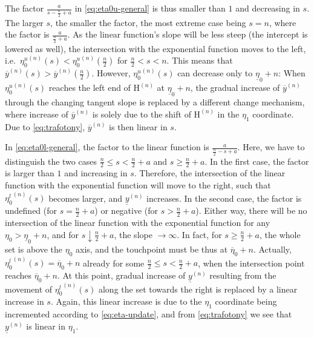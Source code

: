 \documentclass[runningheads,a4paper]{llncs}
\newcommand{\un}{^{(n)}} %
\newcommand{\ul}[1]{\underline{#1}}
\newcommand{\ol}[1]{\overline{#1}}
\def\ynl{\ul{y}\un}
\def\ynu{\ol{y}\un}
\def\EN{\mathrm{H}\un}
\def\ezl{\ul{\eta}_0}
\def\ezu{\ol{\eta}_0}
\begin{document}
The factor $\frac{a}{s - \frac{n}{2} + a}$
in \eqref{eq:eta0u-general} is thus smaller than $1$ and decreasing in $s$.
The larger $s$, the smaller the factor, the most extreme case being $s=n$,
where the factor is $\frac{a}{\frac{n}{2} + a}$.
As the linear function's slope will be less steep (the intercept is lowered as well),
the intersection with the exponential function moves to the left,
i.e.\ ${\eta_0^u}\un(s) < {\eta_0^u}\un(\frac{n}{2})$ for $\frac{n}{2} < s < n$.
This means that $\ynu(s) > \ynu(\frac{n}{2})$.
However, ${\eta_0^u}\un(s)$ can decrease only to $\ezl+n$:
When ${\eta_0^u}\un(s)$ reaches the left end of $\EN$ at $\ezl+n$,
the gradual increase of $\ynu$ through the changing tangent slope 
is replaced by a different change mechanism,
where increase of $\ynu$ is solely due to the shift of $\EN$ in the $\eta_1$ coordinate.
Due to \eqref{eq:trafotony}, $\ynu$ is then linear in $s$.


In \eqref{eq:eta0l-general}, the factor to the linear function is $\frac{a}{\frac{n}{2} - s + a}$.
Here, we have to distinguish the two cases $\frac{n}{2} \le s < \frac{n}{2} + a$
and $s \ge \frac{n}{2} + a$.
In the first case, the factor is larger than $1$ and increasing in $s$.
Therefore, the intersection of the linear function with the exponential function
will move to the right, such that ${\eta_0^l}\un(s)$ becomes larger, and $\ynl$ increases.
In the second case, the factor is undefined (for $s = \frac{n}{2} + a$)
or negative (for $s > \frac{n}{2} + a$).
Either way, there will be no intersection of the linear function with the exponential function
for any $\eta_0 > \ezl + n$, and for $s \downarrow \frac{n}{2} + a$, the slope $\to \infty$.
In fact, for $s \ge \frac{n}{2} + a$, the whole set is above the $\eta_0$ axis,
and the touchpoint must be thus at $\ezu + n$.
Actually, ${\eta_0^l}\un(s) = \ezu + n$ already for some $\frac{n}{2} \le s < \frac{n}{2} + a$,
when the intersection point reaches $\ezu + n$.
At this point, gradual increase of $\ynl$ resulting from the movement of ${\eta_0^l}\un(s)$ along the set
towards the right is replaced by a linear increase in $s$.
Again, this linear increase is due to the $\eta_1$ coordinate being incremented
according to \eqref{eq:eta-update},
and from \eqref{eq:trafotony} we see that $\ynl$ is linear in $\eta_1$.
\end{document}
